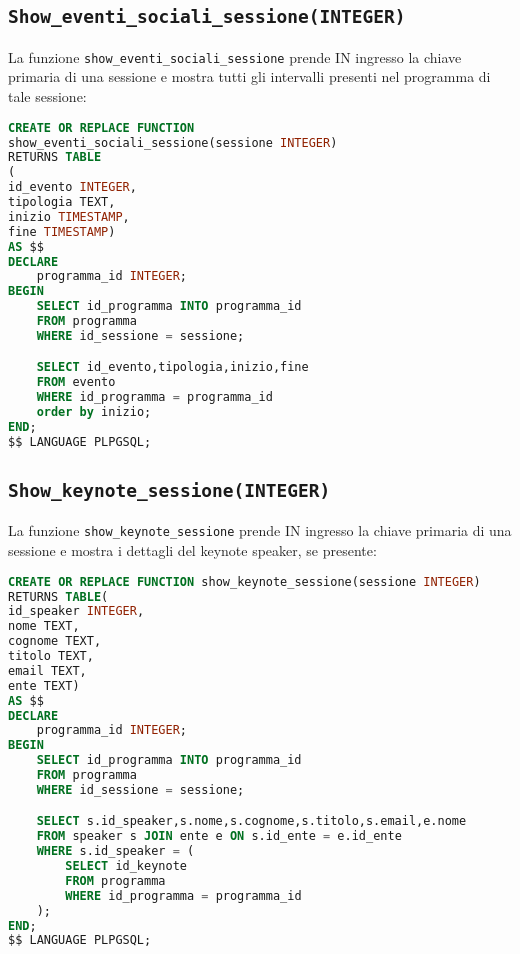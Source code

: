 \subsection{\texttt{Show\_eventi\_sociali\_sessione(INTEGER)}}
La funzione \texttt{show\_eventi\_sociali\_sessione} prende IN ingresso la chiave primaria di una sessione e mostra tutti gli intervalli presenti nel programma di tale sessione:
\begin{lstlisting}[language=SQL,style=mystyle]
CREATE OR REPLACE FUNCTION 
show_eventi_sociali_sessione(sessione INTEGER)
RETURNS TABLE
(
id_evento INTEGER,
tipologia TEXT,
inizio TIMESTAMP,
fine TIMESTAMP) 
AS $$
DECLARE 
	programma_id INTEGER;
BEGIN
	SELECT id_programma INTO programma_id
	FROM programma
	WHERE id_sessione = sessione;

	SELECT id_evento,tipologia,inizio,fine
	FROM evento
	WHERE id_programma = programma_id
	order by inizio;
END;
$$ LANGUAGE PLPGSQL;
\end{lstlisting}
\subsection{\texttt{Show\_keynote\_sessione(INTEGER)}}
La funzione \texttt{show\_keynote\_sessione} prende IN ingresso la chiave primaria di una sessione e mostra i dettagli del keynote speaker, se presente:
\begin{lstlisting}[language=SQL,style=mystyle]
CREATE OR REPLACE FUNCTION show_keynote_sessione(sessione INTEGER)
RETURNS TABLE(
id_speaker INTEGER,
nome TEXT,
cognome TEXT,
titolo TEXT,
email TEXT,
ente TEXT) 
AS $$
DECLARE 
	programma_id INTEGER;
BEGIN
	SELECT id_programma INTO programma_id
	FROM programma
	WHERE id_sessione = sessione;

	SELECT s.id_speaker,s.nome,s.cognome,s.titolo,s.email,e.nome
	FROM speaker s JOIN ente e ON s.id_ente = e.id_ente
	WHERE s.id_speaker = (
		SELECT id_keynote
		FROM programma
		WHERE id_programma = programma_id
	);
END;
$$ LANGUAGE PLPGSQL;
\end{lstlisting}

